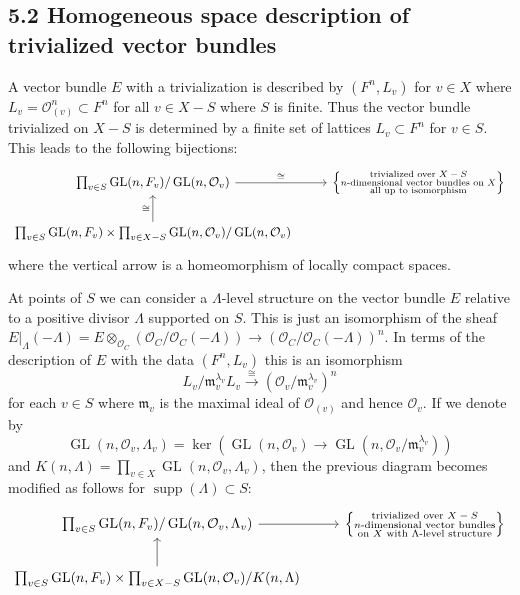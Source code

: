 \documentclass[12pt,a4paper]{article}
\theoremstyle{plain}
\theoremstyle{definition}
\theoremstyle{remark}
\DeclareMathOperator{\GL}{GL}
\DeclareMathOperator{\supp}{supp}
\begin{document}
\subsection*{5.2 Homogeneous space description of trivialized vector bundles}

A vector bundle $E$ with a trivialization is described by $(F^n, L_v)$ for 
$v \in X$ where $L_v = \mathcal{O}_{(v)}^n \subset F^n$ for all $v \in X - S$ 
where $S$ is finite. Thus the vector bundle trivialized on $X - S$ is 
determined by a finite set of lattices $L_v \subset F^n$ for $v \in S$. This 
leads to the following bijections:
\[
\begin{tikzcd}
\prod_{v \in S} \GL(n,F_v)/\GL(n,\mathcal{O}_v) \arrow[r, "\cong"] & \left\{\substack{\text{trivialized over $X-S$}\\\text{$n$-dimensional vector bundles on $X$}\\\text{all up to isomorphism}}\right\} \\
\prod_{v \in S} \GL(n,F_v) \times \prod_{v \in X-S} \GL(n,\mathcal{O}_v)/\GL(n,\mathcal{O}_v) \arrow[u, "\cong"]
\end{tikzcd}
\]
where the vertical arrow is a homeomorphism of locally compact spaces.

At points of $S$ we can consider a $\Lambda$-level structure on the vector 
bundle $E$ relative to a positive divisor $\Lambda$ supported on $S$. This is 
just an isomorphism of the sheaf $E|_\Lambda(-\Lambda) = E \otimes_{\mathcal{O}_C} (\mathcal{O}_C/\mathcal{O}_C(-\Lambda)) \to (\mathcal{O}_C/\mathcal{O}_C(-\Lambda))^n$. 
In terms of the description of $E$ with the data $(F^n, L_v)$ this is an 
isomorphism
\[
L_v/\mathfrak{m}_v^{\lambda_v} L_v \xrightarrow{\;\cong\;} (\mathcal{O}_v/\mathfrak{m}_v^{\lambda_v})^n
\]
for each $v \in S$ where $\mathfrak{m}_v$ is the maximal ideal of 
$\mathcal{O}_{(v)}$ and hence $\mathcal{O}_v$. If we denote by
\[
\GL(n,\mathcal{O}_v,\Lambda_v) = \ker(\GL(n,\mathcal{O}_v) \to \GL(n,\mathcal{O}_v/\mathfrak{m}_v^{\lambda_v}))
\]
and $K(n,\Lambda) = \prod_{v \in X} \GL(n,\mathcal{O}_v,\Lambda_v)$, then the 
previous diagram becomes modified as follows for $\supp(\Lambda) \subset S$:
\[
\begin{tikzcd}
\prod_{v \in S} \GL(n,F_v)/\GL(n,\mathcal{O}_v,\Lambda_v) \arrow[r] & \left\{\substack{\text{trivialized over $X-S$}\\\text{$n$-dimensional vector bundles}\\\text{on $X$ with $\Lambda$-level structure}}\right\} \\
\prod_{v \in S} \GL(n,F_v) \times \prod_{v \in X-S} \GL(n,\mathcal{O}_v)/K(n,\Lambda) \arrow[u]
\end{tikzcd}
\]
\end{document}
